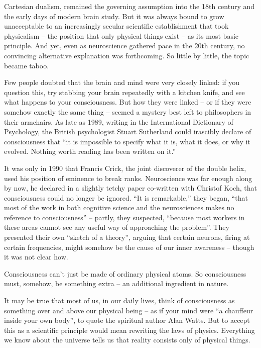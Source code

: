 \documentclass[
]{book}
\begin{document}
Cartesian dualism, remained the governing assumption into the 18th century and the early days of modern brain study. But it was always bound to grow unacceptable to an increasingly secular scientific establishment that took physicalism -- the position that only physical things exist -- as its most basic principle. And yet, even as neuroscience gathered pace in the 20th century, no convincing alternative explanation was forthcoming. So little by little, the topic became taboo.

Few people doubted that the brain and mind were very closely linked: if you question this, try stabbing your brain repeatedly with a kitchen knife, and see what happens to your consciousness. But how they were linked -- or if they were somehow exactly the same thing -- seemed a mystery best left to philosophers in their armchairs. As late as 1989, writing in the International Dictionary of Psychology, the British psychologist Stuart Sutherland could irascibly declare of consciousness that ``it is impossible to specify what it is, what it does, or why it evolved. Nothing worth reading has been written on it.''

It was only in 1990 that Francis Crick, the joint discoverer of the double helix, used his position of eminence to break ranks. Neuroscience was far enough along by now, he declared in a slightly tetchy paper co-written with Christof Koch, that consciousness could no longer be ignored. ``It is remarkable,'' they began, ``that most of the work in both cognitive science and the neurosciences makes no reference to consciousness'' -- partly, they suspected, ``because most workers in these areas cannot see any useful way of approaching the problem''. They presented their own ``sketch of a theory'', arguing that certain neurons, firing at certain frequencies, might somehow be the cause of our inner awareness -- though it was not clear how.

Consciousness can't just be made of ordinary physical atoms. So consciousness must, somehow, be something extra -- an additional ingredient in nature.

It may be true that most of us, in our daily lives, think of consciousness as something over and above our physical being -- as if your mind were ``a chauffeur inside your own body'', to quote the spiritual author Alan Watts. But to accept this as a scientific principle would mean rewriting the laws of physics. Everything we know about the universe tells us that reality consists only of physical things.
\end{document}
